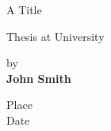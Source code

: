 \thispagestyle{empty}
\begin{center}
\huge{A Title}

\vspace{0.2\textheight}
\large{Thesis at University}

\vspace{0.2\textheight}
\large{by \\ \textbf{John Smith}}

\vspace{0.1\textheight}
\large{Place \\ Date}
\end{center}

\newpage
\thispagestyle{empty}
